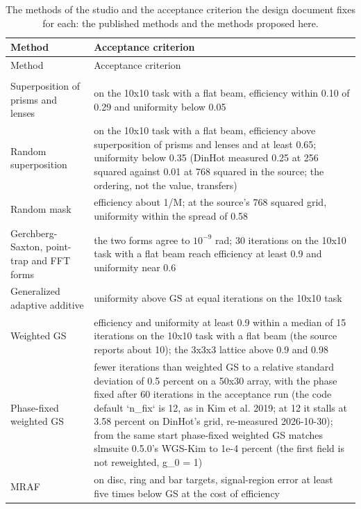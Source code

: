 \begin{longtable}{@{}>{\raggedright\arraybackslash}p{} >{\raggedright\arraybackslash}p{}@{}}
\caption{The methods of the studio and the acceptance criterion the design document fixes for each: the published methods and the methods proposed here.}\label{tab:ladder}\\
\toprule Method & Acceptance criterion\\\midrule\endfirsthead
\toprule Method & Acceptance criterion\\\midrule\endhead
\multicolumn{2}{@{}l}{\textit{Published methods}}\\
Superposition of prisms and lenses & \footnotesize on the 10x10 task with a flat beam, efficiency within 0.10 of 0.29 and uniformity below 0.05\\
Random superposition & \footnotesize on the 10x10 task with a flat beam, efficiency above superposition of prisms and lenses and at least 0.65; uniformity below 0.35 (DinHot measured 0.25 at 256 squared against 0.01 at 768 squared in the source; the ordering, not the value, transfers)\\
Random mask & \footnotesize efficiency about 1/M; at the source's 768 squared grid, uniformity within the spread of 0.58\\
Gerchberg-Saxton, point-trap and FFT forms & \footnotesize the two forms agree to $10^{-9}$ rad; 30 iterations on the 10x10 task with a flat beam reach efficiency at least 0.9 and uniformity near 0.6\\
Generalized adaptive additive & \footnotesize uniformity above GS at equal iterations on the 10x10 task\\
Weighted GS & \footnotesize efficiency and uniformity at least 0.9 within a median of 15 iterations on the 10x10 task with a flat beam (the source reports about 10); the 3x3x3 lattice above 0.9 and 0.98\\
Phase-fixed weighted GS & \footnotesize fewer iterations than weighted GS to a relative standard deviation of 0.5 percent on a 50x30 array, with the phase fixed after 60 iterations in the acceptance run (the code default `n\_fix` is 12, as in Kim et al. 2019; at 12 it stalls at 3.58 percent on DinHot's grid, re-measured 2026-10-30); from the same start phase-fixed weighted GS matches slmsuite 0.5.0's WGS-Kim to 1e-4 percent (the first field is not reweighted, g\_0 = 1)\\
MRAF & \footnotesize on disc, ring and bar targets, signal-region error at least five times below GS at the cost of efficiency\\

\end{longtable}
